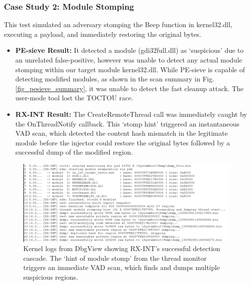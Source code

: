 \documentclass[journal]{IEEEtran}
\begin{document}
\subsubsection{Case Study 2: Module Stomping}
This test simulated an adversary stomping the Beep function in kernel32.dll, executing a payload, and immediately restoring the original bytes.
\begin{itemize}
\item \textbf{PE-sieve Result:} It detected a module (gdi32full.dll) as `suspicious' due to an unrelated false-positive, however was unable to detect any actual module stomping within our target module kernel32.dll. While PE-sieve is capable of detecting modified modules, as shown in the scan summary in Fig. \ref{fig_pesieve_summary}, it was unable to detect the fast cleanup attack. The user-mode tool lost the TOCTOU race.
\item \textbf{RX-INT Result:} The CreateRemoteThread call was immediately caught by the OnThreadNotify callback. This `stomp hint' triggered an instantaneous VAD scan, which detected the content hash mismatch in the legitimate module before the injector could restore the original bytes followed by a successful dump of the modified region.
\end{itemize}
\begin{figure}[!t]
\centering
\includegraphics[width=\columnwidth]{figures/dbgview_modulestomp.png}
\caption{Kernel logs from DbgView showing RX-INT's successful detection cascade. The `hint of module stomp' from the thread monitor triggers an immediate VAD scan, which finds and dumps multiple suspicious regions.}
\label{fig_dbgview_modulestomp}
\end{figure}
\end{document}

